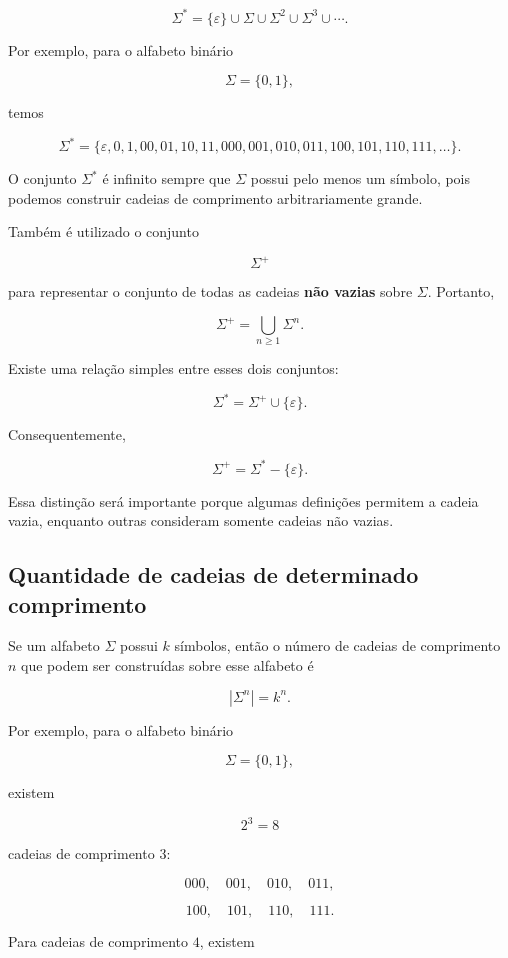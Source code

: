 \documentclass[
  brazilian,
  letterpaper,
]{book}
\theoremstyle{plain}
\theoremstyle{definition}
\theoremstyle{remark}
\begin{document}
\[
\Sigma^*=
\{\varepsilon\}
\cup
\Sigma
\cup
\Sigma^2
\cup
\Sigma^3
\cup\cdots.
\]

Por exemplo, para o alfabeto binário

\[
\Sigma=\{0,1\},
\]

temos

\[
\Sigma^*=
\{
\varepsilon,
0,
1,
00,
01,
10,
11,
000,
001,
010,
011,
100,
101,
110,
111,
\ldots
\}.
\]

O conjunto \(\Sigma^*\) é infinito sempre que \(\Sigma\) possui pelo
menos um símbolo, pois podemos construir cadeias de comprimento
arbitrariamente grande.

Também é utilizado o conjunto

\[
\Sigma^+
\]

para representar o conjunto de todas as cadeias \textbf{não vazias}
sobre \(\Sigma\). Portanto,

\[
\Sigma^+=\bigcup_{n\geq1}\Sigma^n.
\]

Existe uma relação simples entre esses dois conjuntos:

\[
\Sigma^*=\Sigma^+\cup\{\varepsilon\}.
\]

Consequentemente,

\[
\Sigma^+=\Sigma^*-\{\varepsilon\}.
\]

Essa distinção será importante porque algumas definições permitem a
cadeia vazia, enquanto outras consideram somente cadeias não vazias.

\subsection{Quantidade de cadeias de determinado
comprimento}\label{quantidade-de-cadeias-de-determinado-comprimento}

Se um alfabeto \(\Sigma\) possui \(k\) símbolos, então o número de
cadeias de comprimento \(n\) que podem ser construídas sobre esse
alfabeto é

\[
|\Sigma^n|=k^n.
\]

Por exemplo, para o alfabeto binário

\[
\Sigma=\{0,1\},
\]

existem

\[
2^3=8
\]

cadeias de comprimento \(3\):

\[
000,\quad001,\quad010,\quad011,
\]

\[
100,\quad101,\quad110,\quad111.
\]

Para cadeias de comprimento \(4\), existem
\end{document}
